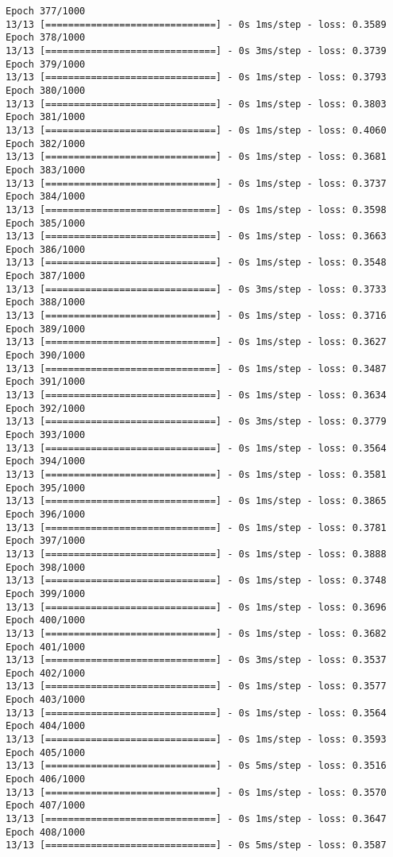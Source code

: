 \documentclass[11pt]{article}
\begin{document}
\begin{Verbatim}[commandchars=\\\{\}]
Epoch 377/1000
13/13 [==============================] - 0s 1ms/step - loss: 0.3589
Epoch 378/1000
13/13 [==============================] - 0s 3ms/step - loss: 0.3739
Epoch 379/1000
13/13 [==============================] - 0s 1ms/step - loss: 0.3793
Epoch 380/1000
13/13 [==============================] - 0s 1ms/step - loss: 0.3803
Epoch 381/1000
13/13 [==============================] - 0s 1ms/step - loss: 0.4060
Epoch 382/1000
13/13 [==============================] - 0s 1ms/step - loss: 0.3681
Epoch 383/1000
13/13 [==============================] - 0s 1ms/step - loss: 0.3737
Epoch 384/1000
13/13 [==============================] - 0s 1ms/step - loss: 0.3598
Epoch 385/1000
13/13 [==============================] - 0s 1ms/step - loss: 0.3663
Epoch 386/1000
13/13 [==============================] - 0s 1ms/step - loss: 0.3548
Epoch 387/1000
13/13 [==============================] - 0s 3ms/step - loss: 0.3733
Epoch 388/1000
13/13 [==============================] - 0s 1ms/step - loss: 0.3716
Epoch 389/1000
13/13 [==============================] - 0s 1ms/step - loss: 0.3627
Epoch 390/1000
13/13 [==============================] - 0s 1ms/step - loss: 0.3487
Epoch 391/1000
13/13 [==============================] - 0s 1ms/step - loss: 0.3634
Epoch 392/1000
13/13 [==============================] - 0s 3ms/step - loss: 0.3779
Epoch 393/1000
13/13 [==============================] - 0s 1ms/step - loss: 0.3564
Epoch 394/1000
13/13 [==============================] - 0s 1ms/step - loss: 0.3581
Epoch 395/1000
13/13 [==============================] - 0s 1ms/step - loss: 0.3865
Epoch 396/1000
13/13 [==============================] - 0s 1ms/step - loss: 0.3781
Epoch 397/1000
13/13 [==============================] - 0s 1ms/step - loss: 0.3888
Epoch 398/1000
13/13 [==============================] - 0s 1ms/step - loss: 0.3748
Epoch 399/1000
13/13 [==============================] - 0s 1ms/step - loss: 0.3696
Epoch 400/1000
13/13 [==============================] - 0s 1ms/step - loss: 0.3682
Epoch 401/1000
13/13 [==============================] - 0s 3ms/step - loss: 0.3537
Epoch 402/1000
13/13 [==============================] - 0s 1ms/step - loss: 0.3577
Epoch 403/1000
13/13 [==============================] - 0s 1ms/step - loss: 0.3564
Epoch 404/1000
13/13 [==============================] - 0s 1ms/step - loss: 0.3593
Epoch 405/1000
13/13 [==============================] - 0s 5ms/step - loss: 0.3516
Epoch 406/1000
13/13 [==============================] - 0s 1ms/step - loss: 0.3570
Epoch 407/1000
13/13 [==============================] - 0s 1ms/step - loss: 0.3647
Epoch 408/1000
13/13 [==============================] - 0s 5ms/step - loss: 0.3587

\end{Verbatim}
\end{document}
